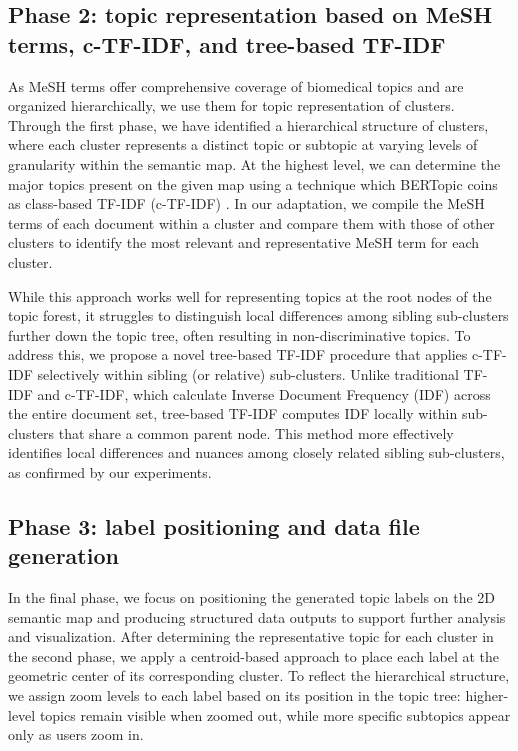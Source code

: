 \documentclass{vgtc}                          %
\begin{document}
\subsection{Phase 2: topic representation based on MeSH terms, c-TF-IDF, and tree-based TF-IDF}

As MeSH terms offer comprehensive coverage of biomedical topics and are organized hierarchically, we use them for topic representation of clusters. Through the first phase, we have identified a hierarchical structure of clusters, where each cluster represents a distinct topic or subtopic at varying levels of granularity within the semantic map. 
At the highest level, we can determine the major topics present on the given map using a technique which BERTopic coins as class-based TF-IDF (c-TF-IDF) \cite{Grootendorst2022}. In our adaptation, we compile the MeSH terms of each document within a cluster and compare them with those of other clusters to identify the most relevant and representative MeSH term for each cluster.

While this approach works well for representing topics at the root nodes of the topic forest, it struggles to distinguish local differences among sibling sub-clusters further down the topic tree, often resulting in non-discriminative topics. To address this, we propose a novel tree-based TF-IDF procedure that applies c-TF-IDF selectively within sibling (or relative) sub-clusters. Unlike traditional TF-IDF and c-TF-IDF, which calculate Inverse Document Frequency (IDF) across the entire document set, tree-based TF-IDF computes IDF locally within sub-clusters that share a common parent node. This method more effectively identifies local differences and nuances among closely related sibling sub-clusters, as confirmed by our experiments.


\subsection{Phase 3: label positioning and data file generation}

In the final phase, we focus on positioning the generated topic labels on the 2D semantic map and producing structured data outputs to support further analysis and visualization. After determining the representative topic for each cluster in the second phase, we apply a centroid-based approach to place each label at the geometric center of its corresponding cluster. To reflect the hierarchical structure, we assign zoom levels to each label based on its position in the topic tree: higher-level topics remain visible when zoomed out, while more specific subtopics appear only as users zoom in.
\end{document}
